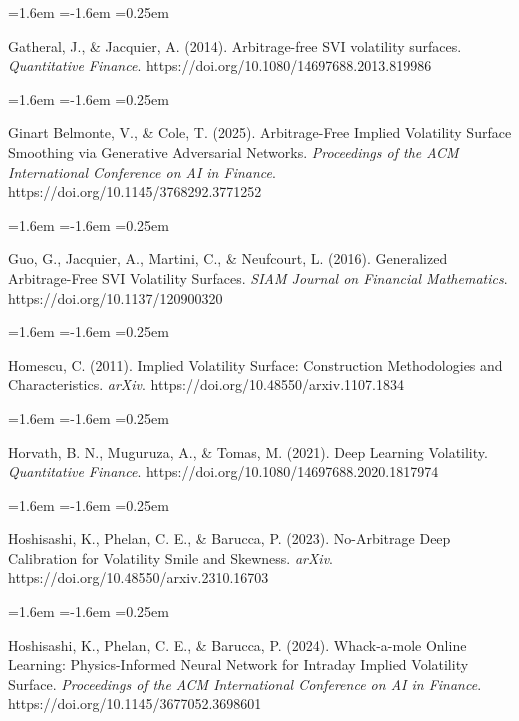 \documentclass[11pt]{article}
\begin{document}
\begin{list}{}{\leftmargin=1.6em \itemindent=-1.6em \itemsep=0.25em}
\item Gatheral, J., \& Jacquier, A. (2014). Arbitrage-free SVI volatility surfaces. \textit{Quantitative Finance}. https://doi.org/10.1080/14697688.2013.819986
\end{list}
\begin{list}{}{\leftmargin=1.6em \itemindent=-1.6em \itemsep=0.25em}
\item Ginart Belmonte, V., \& Cole, T. (2025). Arbitrage-Free Implied Volatility Surface Smoothing via Generative Adversarial Networks. \textit{Proceedings of the ACM International Conference on AI in Finance}. https://doi.org/10.1145/3768292.3771252
\end{list}
\begin{list}{}{\leftmargin=1.6em \itemindent=-1.6em \itemsep=0.25em}
\item Guo, G., Jacquier, A., Martini, C., \& Neufcourt, L. (2016). Generalized Arbitrage-Free SVI Volatility Surfaces. \textit{SIAM Journal on Financial Mathematics}. https://doi.org/10.1137/120900320
\end{list}
\begin{list}{}{\leftmargin=1.6em \itemindent=-1.6em \itemsep=0.25em}
\item Homescu, C. (2011). Implied Volatility Surface: Construction Methodologies and Characteristics. \textit{arXiv}. https://doi.org/10.48550/arxiv.1107.1834
\end{list}
\begin{list}{}{\leftmargin=1.6em \itemindent=-1.6em \itemsep=0.25em}
\item Horvath, B. N., Muguruza, A., \& Tomas, M. (2021). Deep Learning Volatility. \textit{Quantitative Finance}. https://doi.org/10.1080/14697688.2020.1817974
\end{list}
\begin{list}{}{\leftmargin=1.6em \itemindent=-1.6em \itemsep=0.25em}
\item Hoshisashi, K., Phelan, C. E., \& Barucca, P. (2023). No-Arbitrage Deep Calibration for Volatility Smile and Skewness. \textit{arXiv}. https://doi.org/10.48550/arxiv.2310.16703
\end{list}
\begin{list}{}{\leftmargin=1.6em \itemindent=-1.6em \itemsep=0.25em}
\item Hoshisashi, K., Phelan, C. E., \& Barucca, P. (2024). Whack-a-mole Online Learning: Physics-Informed Neural Network for Intraday Implied Volatility Surface. \textit{Proceedings of the ACM International Conference on AI in Finance}. https://doi.org/10.1145/3677052.3698601
\end{list}
\end{document}
